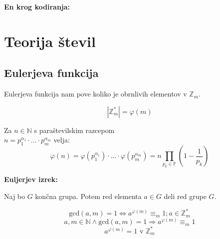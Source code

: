 \begin{multicols}{4}
\textbf{En krog kodiranja:}
\begin{center}
\end{center}

\section*{Teorija števil}

\subsection{Eulerjeva funkcija}
Eulerjeva funkcija nam pove koliko je obrnlivih elementov v $\mathbb{Z}_m$.

\[ | \mathbb{Z}_m^* | = \varphi(m) \]

Za $n \in \mathbb{N}$ s paraštevilskim razcepom \\ $ n = p_1^{\alpha_1} \cdot ... \cdot p_m^{\alpha_m}$ velja:
\[\varphi(n) = \varphi(p_1^{\alpha_1}) \cdot ... \cdot \varphi(p_m^{\alpha_m}) = n \prod_{ p_k \in \mathbb{P}} \left(1-\frac{1}{p_k} \right) \]

\textbf{Euljerjev izrek:}

Naj bo $G$ končna grupa. Potem red elementa $a \in G$ deli red grupe $G$.

\[\textrm{gcd}(a, m) = 1 \Leftrightarrow a^{\varphi(m)} \equiv_m 1; a \in \mathbb{Z}_m^*\]
\[a,m \in \mathbb{N} \wedge \textrm{gcd}(a, m) = 1 \Rightarrow a^{\varphi(m)} \equiv_m 1\]
\[a^{\varphi(m)} = 1 \text{ v } \mathbb{Z}_m^*\]


\end{multicols}
